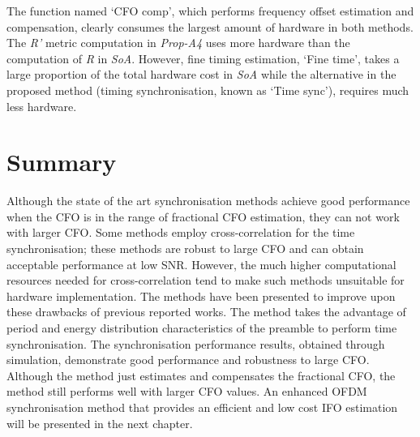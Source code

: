 The function named `CFO comp', which performs frequency offset estimation and compensation, clearly consumes the largest amount of hardware in both methods.
The \emph{R'} metric computation in \textit{Prop-A4} uses more hardware than the computation of \emph{R} in \textit{SoA}. However, fine timing estimation, `Fine time', takes a large proportion of the total hardware cost in \textit{SoA} while the alternative in the proposed method (timing synchronisation, known as `Time sync'), requires much less hardware.

\section{Summary}

Although the state of the art synchronisation methods achieve good performance when the CFO is in the range of fractional CFO estimation, they can not work with larger CFO. 
Some methods employ cross-correlation for the time synchronisation; these methods are robust to large CFO and can obtain acceptable performance at low SNR.
However, the much higher computational resources needed for cross-correlation tend to make such methods unsuitable for hardware implementation.
The methods have been presented to improve upon these drawbacks of previous reported works. 
The method takes the advantage of period and energy distribution characteristics of the preamble to perform time synchronisation. 
The synchronisation performance results, obtained through simulation, demonstrate good performance and robustness to large CFO.
Although the method just estimates and compensates the fractional CFO, the method still performs well with larger CFO values. 
An enhanced OFDM synchronisation method that provides an efficient and low cost IFO estimation will be presented in the next chapter.

